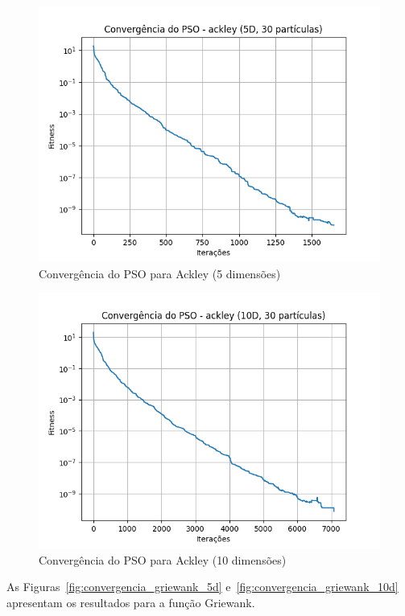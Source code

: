 \documentclass[12pt]{article}
\begin{document}
\begin{figure}[H]
  \centering
  \includegraphics[width=.9\textwidth]{../graphs/convergencia_ackley_5D.png}
  \caption{Convergência do PSO para Ackley (5 dimensões)}
  \label{fig:convergencia_ackley_5d}
\end{figure}

\begin{figure}[H]
  \centering
  \includegraphics[width=.9\textwidth]{../graphs/convergencia_ackley_10D.png}
  \caption{Convergência do PSO para Ackley (10 dimensões)}
  \label{fig:convergencia_ackley_10d}
\end{figure}

As Figuras~\ref{fig:convergencia_griewank_5d} e~\ref{fig:convergencia_griewank_10d} apresentam os resultados para a função Griewank.
\end{document}
